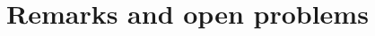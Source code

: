 \documentclass[11pt,leqno]{amsart}
\theoremstyle{remark}
\theoremstyle{plain}
\newcommand{\eps}{\epsilon}
\begin{document}

\section{Remarks and open problems}
\end{document}
